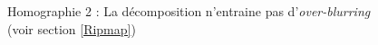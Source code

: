 \begin{figure}
\caption{Homographie 2 : La décomposition n'entraine pas d'\emph{over-blurring} (voir section \ref{Ripmap})}
\label{Homo2}
\end{figure}

